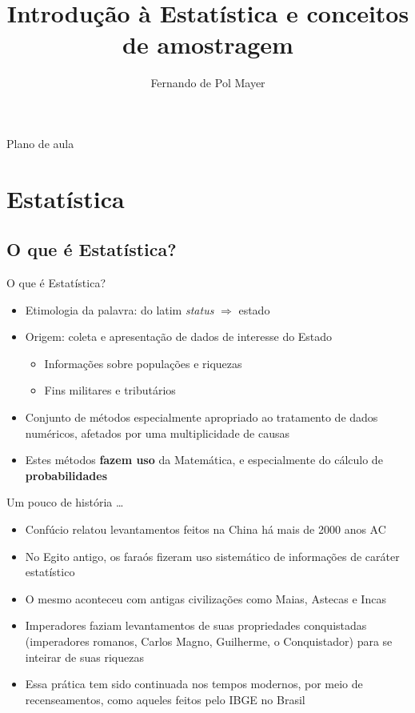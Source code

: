 \documentclass[10pt]{beamer}
\title{Introdução à Estatística e conceitos de amostragem}
\author[]{Fernando de Pol Mayer}
\institute[UFPR]{Laboratório de Estatística e Geoinformação (LEG) \\
  Departamento de Estatística (DEST) \\
  Universidade Federal do Paraná (UFPR)}
\date{}
\theoremstyle{definition}
\begin{document}
\begin{frame}
\maketitle
\end{frame}

\begin{frame}{Plano de aula}
\tableofcontents
\end{frame}

\section[Estatística]{Estatística}

\subsection[O que é?]{O que é Estatística?}

\begin{frame}{O que é Estatística?}
  \begin{itemize}
  \item Etimologia da palavra: do latim \textit{status} $\Rightarrow$
    estado
  \item Origem: coleta e apresentação de dados de interesse do Estado
    \begin{itemize}
    \item Informações sobre populações e riquezas
    \item Fins militares e tributários
    \end{itemize}
  \item Conjunto de métodos especialmente apropriado ao tratamento de
    dados numéricos, afetados por uma multiplicidade de causas
  \item Estes métodos \textbf{fazem uso} da Matemática, e especialmente
    do cálculo de \textbf{probabilidades}
  \end{itemize}
\end{frame}

\begin{frame}{Um pouco de história \ldots}
  \begin{itemize}
  \item Confúcio relatou levantamentos feitos na China há mais de 2000
    anos AC
  \item No Egito antigo, os faraós fizeram uso sistemático de
    informações de caráter estatístico
  \item O mesmo aconteceu com antigas civilizações como Maias, Astecas e
    Incas
  \item Imperadores faziam levantamentos de suas propriedades
    conquistadas (imperadores romanos, Carlos Magno, Guilherme, o
    Conquistador) para se inteirar de suas riquezas
  \item Essa prática tem sido continuada nos tempos modernos, por meio
    de recenseamentos, como aqueles feitos pelo IBGE no Brasil
  \end{itemize}
\end{frame}
\end{document}
